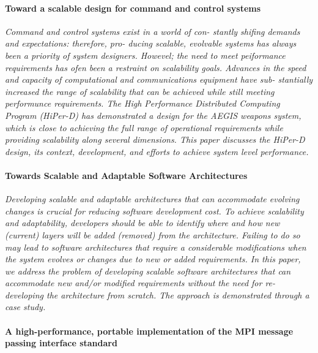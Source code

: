 \documentclass{article}
\begin{document}
{\paragraph{Toward a scalable design for command and control systems}
\cite{caruso1997toward}

\emph{ Command and control systems exist in a world of con- stantly shifing
demands and expectations: therefore, pro- ducing scalable, evolvable systems
has always been a priority of system designers. Howevel; the need to meet
peiformance requirements has ofen been a restraint on scalability goals.
Advances in the speed and capacity of computational and communications
equipment have sub- stantially increased the range of scalability that can be
achieved while still meeting performunce requirements.  The High Performance
Distributed Computing Program (HiPer-D) has demonstrated a design for the AEGIS
weapons system, which is close to achieving the full range of operational
requirements while providing scalability along several dimensions. This paper
discusses the HiPer-D design, its context, development, and efforts to achieve
system level performance.}

\paragraph{Towards Scalable and Adaptable Software Architectures} \cite{fayad2005towards}

\emph{Developing scalable and adaptable architectures that can accommodate
evolving changes is crucial for reducing software development cost. To achieve
scalability and adaptability, developers should be able to identify where and
how new (current) layers will be added (removed) from the architecture.
Failing to do so may lead to software architectures that require a considerable
modifications when the system evolves or changes due to new or added
requirements. In this paper, we address the problem of developing scalable
software architectures that can accommodate new and/or modified requirements
without the need for re-developing the architecture from scratch. The approach
is demonstrated through a case study.}

\paragraph{A high-performance, portable implementation of the MPI message passing
interface standard} \cite{gropp1996high}

}
\end{document}

